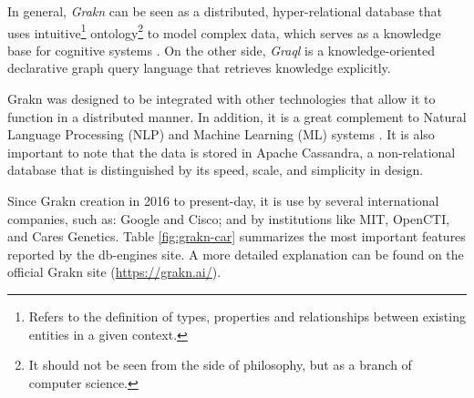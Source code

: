 In general, \textit{Grakn} can be seen as a distributed, hyper-relational 
database that uses intuitive\footnote{Refers to the definition of types, 
properties and relationships between existing entities in a given context.} 
ontology\footnote{It should not be seen from the side of philosophy, but as a 
branch of computer science.}  to model complex data, which serves as a 
knowledge base for cognitive systems \cite{dbengines}. On the other side, 
\textit{Graql} is a knowledge-oriented declarative graph query language that 
retrieves knowledge explicitly.

Grakn was designed to be integrated with other technologies that allow it to 
function in a distributed manner. In addition, it is a great complement to 
Natural Language Processing (NLP) and Machine Learning (ML) systems 
\cite{grakn-youtube}. It is also important to note that the data is stored in 
Apache Cassandra, a non-relational database that is distinguished by its speed, 
scale, and simplicity in design.

Since Grakn creation in 2016 to present-day, it is use by several international 
companies, such as: Google and Cisco; and by institutions like MIT, OpenCTI, 
and Cares Genetics. Table \ref{fig:grakn-car} summarizes the most important 
features reported by the db-engines \cite{dbengines} site. A more detailed 
explanation can be found on the official Grakn site (\url{https://grakn.ai/}).

